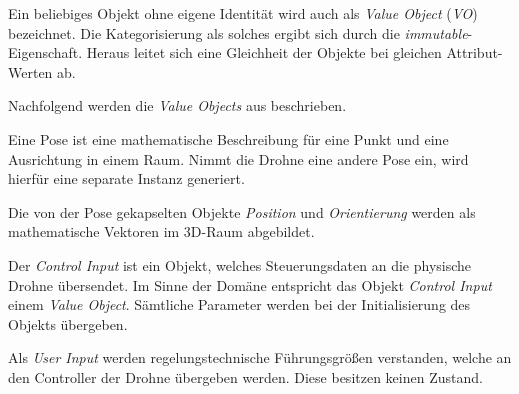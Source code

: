 
Ein beliebiges Objekt ohne eigene Identität wird auch als \textit{Value Object} (\textit{VO}) bezeichnet.
Die Kategorisierung als solches ergibt sich durch die \textit{immutable}-Eigenschaft. Heraus leitet sich eine Gleichheit der Objekte bei gleichen Attribut-Werten ab.

Nachfolgend werden die \textit{Value Objects} aus  beschrieben.


Eine Pose ist eine mathematische Beschreibung für eine Punkt und eine Ausrichtung in einem Raum. Nimmt die Drohne eine andere Pose ein, wird hierfür eine separate Instanz generiert.

Die von der Pose gekapselten Objekte \textit{Position} und \textit{Orientierung} werden als mathematische Vektoren im 3D-Raum abgebildet.


Der \textit{Control Input} ist ein Objekt, welches Steuerungsdaten an die physische Drohne übersendet.
Im Sinne der Domäne entspricht das Objekt \textit{Control Input} einem \textit{Value Object}.
Sämtliche Parameter werden bei der Initialisierung des Objekts übergeben.


Als \textit{User Input} werden regelungstechnische Führungsgrößen verstanden, welche an den Controller der Drohne übergeben werden. Diese besitzen keinen Zustand.



